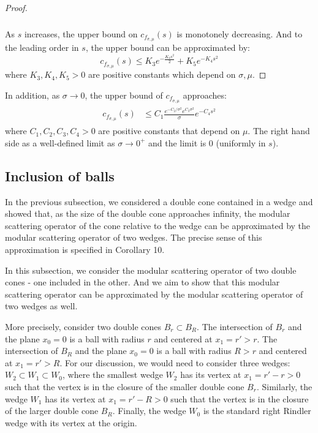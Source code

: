 \documentclass[a4paper,11pt]{article}
\theoremstyle{definition}
\begin{document}
\begin{proof}
\begin{align}
\begin{split}
        \end{split}
    \end{align}
    As $s$ increases, the upper bound on $c_{f_{\sigma,\mu}}(s)$ is monotonely decreasing. And to the leading order in $s$, the upper bound can be approximated by:
    \begin{equation}
        c_{f_{\sigma,\mu}}(s) \leq K_3e^{-\frac{K_4 s^2}{2}} + K_5e^{-K_4 s^2}
    \end{equation}
    where $K_3, K_4, K_5 > 0$ are positive constants which depend on $\sigma, \mu$. 
\end{proof}
In addition, as $\sigma \rightarrow 0$, the upper bound of $c_{f_{\sigma, \mu}}$ approaches:
\begin{align}
    \begin{split}
        c_{f_{\sigma,\mu}}(s) &\leq C_1 \frac{e^{-C_2/\sigma^2}e^{C_3\sigma^2}}{\sigma}e^{-C_4s^2}
    \end{split}
\end{align}
where $C_1,C_2,C_3, C_4 > 0$ are positive constants that depend on $\mu$. The right hand side as a well-defined limit as $\sigma\rightarrow 0^+$ and the limit is $0$ (uniformly in $s$).


\subsection{Inclusion of balls}\label{subsection:ballinball}
In the previous subsection, we considered a double cone contained in a wedge and showed that, as the size of the double cone approaches infinity, the modular scattering operator of the cone relative to the wedge can be approximated by the modular scattering operator of two wedges. The precise sense of this approximation is specified in Corollary 10. 

In this subsection, we consider the modular scattering operator of two double cones - one included in the other. And we aim to show that this modular scattering operator can be approximated by the modular scattering operator of two wedges as well. 

More precisely, consider two double cones $B_r \subset B_R$. The intersection of $B_r$ and the plane $x_0 = 0$ is a ball with radius $r$ and centered at $x_1 = r' > r$. The intersection of $B_R$ and the plane $x_0 = 0$ is a ball with radius $R > r$ and centered at $x_1 = r' > R$. For our discussion, we would need to consider three wedges: $W_2\subset W_1\subset W_0$, where the smallest wedge $W_2$ has its vertex at $x_1 = r' - r > 0$ such that the vertex is in the closure of the smaller double cone $B_r$. Similarly, the wedge $W_1$ has its vertex at $x_1 = r' - R > 0$ such that the vertex is in the closure of the larger double cone $B_R$. Finally, the wedge $W_0$ is the standard right Rindler wedge with its vertex at the origin. 
\end{document}
